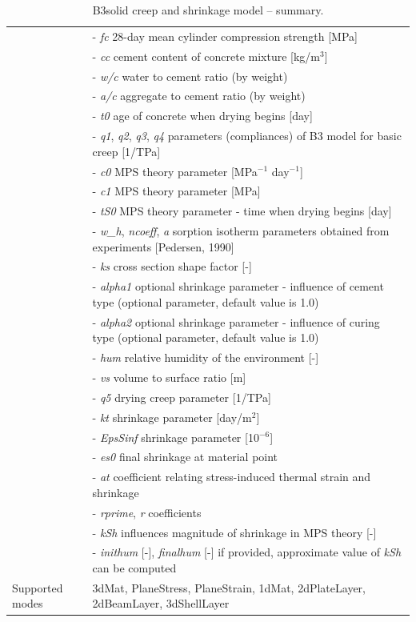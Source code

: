\documentclass[a4paper]{article}
\newcommand{\param}[1]{{\it #1}}
\newenvironment{mmt}{\begin{tabular}{|l|p{9cm}|}}{\end{tabular}\\}
\newenvironment{mmt}{\begin{tabular}{|l|l|}}{\end{tabular}\\}
\begin{document}
\begin{table}
\begin{mmt}
\hline
&- \param{fc} 28-day mean cylinder compression strength [MPa]\\
&- \param{cc} cement content of concrete mixture  [kg/m$^{3}$] \\
&- \param{w/c} water to cement ratio (by weight)\\
&- \param{a/c} aggregate to cement ratio (by weight)\\
&- \param{t0} age of concrete when drying begins [day]\\
&- \param{q1}, \param{q2}, \param{q3}, \param{q4} parameters
(compliances) of B3 model for basic creep [1/TPa]\\

&- \param{c0} MPS theory parameter [MPa$^{-1}$ day$^{-1}$] \\
&- \param{c1} MPS theory parameter [MPa]\\
&- \param{tS0} MPS theory parameter - time when drying begins [day]\\
&- \param{w\_h}, \param{ncoeff}, \param{a} sorption isotherm parameters obtained from experiments [Pedersen, 1990] \\

&- \param{ks} cross section shape factor [-]\\
&- \param{alpha1} optional shrinkage parameter - influence of cement type (optional parameter, default value is 1.0)\\
&- \param{alpha2} optional shrinkage parameter - influence of curing type (optional parameter, default value is 1.0)\\
&- \param{hum} relative humidity of the environment [-]\\
&- \param{vs} volume to surface ratio [m]\\
&- \param{q5} drying creep parameter [1/TPa]\\
&- \param{kt} shrinkage parameter [day/m$^2$]\\
&- \param{EpsSinf} shrinkage parameter [10$^{-6}$]\\

&- \param{es0} final shrinkage at material point\\
&- \param{at} coefficient relating stress-induced thermal strain and shrinkage\\
&- \param{rprime}, \param{r} coefficients\\

&- \param{kSh} influences magnitude of shrinkage in MPS theory [-]\\
&- \param{inithum} [-], \param{finalhum} [-] if provided, approximate value of \param{kSh} can be computed\\


Supported modes& 3dMat, PlaneStress, PlaneStrain, 1dMat,
2dPlateLayer, 2dBeamLayer, 3dShellLayer\\
\hline
\end{mmt}

\caption{B3solid creep and shrinkage model -- summary.}
\label{b3solid_table}

\end{table}
\end{document}
